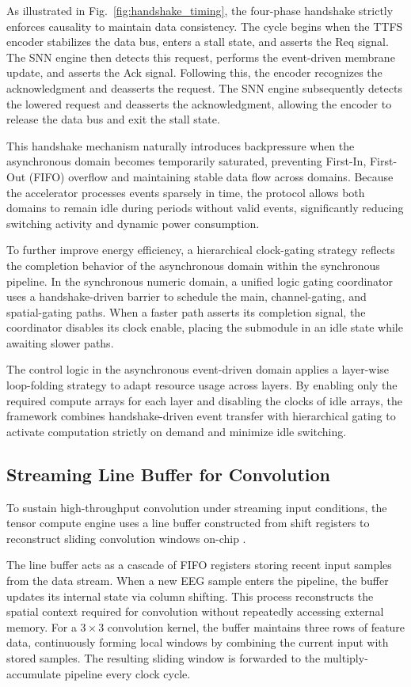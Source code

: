 \documentclass[12pt]{article}
\begin{document}
As illustrated in Fig.~\ref{fig:handshake_timing}, the four-phase handshake strictly enforces causality to maintain data consistency. The cycle begins when the TTFS encoder stabilizes the data bus, enters a stall state, and asserts the Req signal. The SNN engine then detects this request, performs the event-driven membrane update, and asserts the Ack signal. Following this, the encoder recognizes the acknowledgment and deasserts the request. The SNN engine subsequently detects the lowered request and deasserts the acknowledgment, allowing the encoder to release the data bus and exit the stall state.

This handshake mechanism naturally introduces backpressure when the asynchronous domain becomes temporarily saturated, preventing First-In, First-Out (FIFO) overflow and maintaining stable data flow across domains. Because the accelerator processes events sparsely in time, the protocol allows both domains to remain idle during periods without valid events, significantly reducing switching activity and dynamic power consumption.

To further improve energy efficiency, a hierarchical clock-gating strategy reflects the completion behavior of the asynchronous domain within the synchronous pipeline. In the synchronous numeric domain, a unified logic gating coordinator uses a handshake-driven barrier to schedule the main, channel-gating, and spatial-gating paths. When a faster path asserts its completion signal, the coordinator disables its clock enable, placing the submodule in an idle state while awaiting slower paths.

The control logic in the asynchronous event-driven domain applies a layer-wise loop-folding strategy to adapt resource usage across layers. By enabling only the required compute arrays for each layer and disabling the clocks of idle arrays, the framework combines handshake-driven event transfer with hierarchical gating to activate computation strictly on demand and minimize idle switching.

\subsection{Streaming Line Buffer for Convolution}
To sustain high-throughput convolution under streaming input conditions, the tensor compute engine uses a line buffer constructed from shift registers to reconstruct sliding convolution windows on-chip \cite{conv}.

The line buffer acts as a cascade of FIFO registers storing recent input samples from the data stream. When a new EEG sample enters the pipeline, the buffer updates its internal state via column shifting. This process reconstructs the spatial context required for convolution without repeatedly accessing external memory. For a $3\times3$ convolution kernel, the buffer maintains three rows of feature data, continuously forming local windows by combining the current input with stored samples. The resulting sliding window is forwarded to the multiply-accumulate pipeline every clock cycle.
\end{document}
